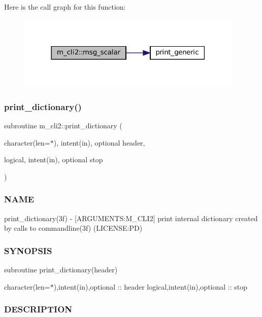 Here is the call graph for this function\+:\nopagebreak
\begin{figure}[H]
\begin{center}
\leavevmode
\includegraphics[width=306pt]{namespacem__cli2_a737dc863a63dc101338840baad1cfd17_cgraph}
\end{center}
\end{figure}
\mbox{\label{namespacem__cli2_acbd726aa5c13b005a14c06d58915cb9a}} 
\subsubsection{\texorpdfstring{print\+\_\+dictionary()}{print\_dictionary()}}
{\footnotesize\ttfamily subroutine m\+\_\+cli2\+::print\+\_\+dictionary (\begin{DoxyParamCaption}\item[{character(len=$\ast$), intent(in), optional}]{header,  }\item[{logical, intent(in), optional}]{stop }\end{DoxyParamCaption})\hspace{0.3cm}{\ttfamily [private]}}



\subsubsection*{N\+A\+ME}

print\+\_\+dictionary(3f) -\/ \mbox{[}A\+R\+G\+U\+M\+E\+N\+TS\+:M\+\_\+\+C\+L\+I2\mbox{]} print internal dictionary created by calls to commandline(3f) (L\+I\+C\+E\+N\+SE\+:PD) \subsubsection*{S\+Y\+N\+O\+P\+S\+IS}

subroutine print\+\_\+dictionary(header)

character(len=$\ast$),intent(in),optional \+:\+: header logical,intent(in),optional \+:\+: stop \subsubsection*{D\+E\+S\+C\+R\+I\+P\+T\+I\+ON}

